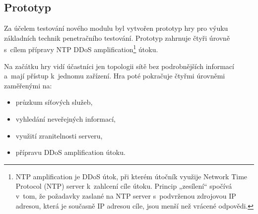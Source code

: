 \documentclass[
  digital, %
  oneside, %
  table,   %
  nolof,     %
  nolot,     %
]{fithesis3}
\begin{document}
\subsection{Prototyp}
Za účelem testování nového modulu byl vytvořen prototyp hry pro výuku základních technik penetračního testování. Prototyp zahrnuje čtyři úrovně s~cílem přípravy NTP DDoS amplification\footnote{NTP amplification je DDoS útok, při kterém útočník využije Network Time Protocol (NTP) server k~zahlcení cíle útoku. Princip „zesílení“ spočívá v~tom, že požadavky zaslané na NTP server s~podvrženou zdrojovou IP adresou, která je současně IP adresou cíle, jsou menší než vrácené odpovědi.} útoku.\par
Na začátku hry vidí účastníci jen topologii sítě bez podrobnějších informací a~mají přístup k~jednomu zařízení. Hra poté pokračuje čtyřmi úrovněmi zaměřenými na:
\begin{itemize}
  \item průzkum síťových služeb,
  \item vyhledání neveřejných informací,
  \item využití zranitelnosti serveru,
  \item přípravu DDoS amplification útoku.
\end{itemize}
\end{document}
